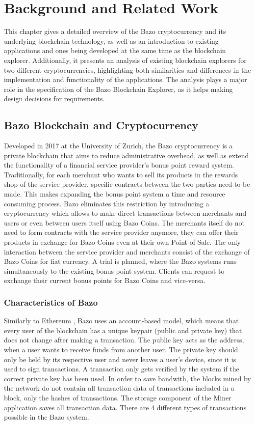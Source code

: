 \chapter{Background and Related Work}
This chapter gives a detailed overview of the Bazo cryptocurrency and its underlying blockchain technology, as well as an introduction to existing applications and ones being developed at the same time as the blockchain explorer. Additionally, it presents an analysis of existing blockchain explorers for two different cryptocurrencies, highlighting both similarities and differences in the implementation and functionality of the applications. The analysis plays a major role in the specification of the Bazo Blockchain Explorer, as it helps making design decisions for requirements.

\section{Bazo Blockchain and Cryptocurrency}
Developed in 2017 at the University of Zurich, the Bazo cryptocurrency is a private blockchain that aims to reduce administrative overhead, as well as extend the functionality of a financial service provider's bonus point reward system. Traditionally, for each merchant who wants to sell its products in the rewards shop of the service provider, specific contracts between the two parties need to be made. This makes expanding the bonus point system a time and resource consuming process. Bazo eliminates this restriction by introducing a cryptocurrency which allows to make direct transactions between merchants and users or even between users itself using Bazo Coins. The merchants itself do not need to form contracts with the service provider anymore, they can offer their products in exchange for Bazo Coins even at their own Point-of-Sale. The only interaction between the service provider and merchants consist of the exchange of Bazo Coins for fiat currency. A trial is planned, where the Bazo systems runs simultaneously to the existing bonus point system. Clients can request to exchange their current bonus points for Bazo Coins and vice-versa.

\subsection{Characteristics of Bazo}
Similarly to Ethereum \cite{ethereum}, Bazo uses an account-based model, which means that every user of the blockchain has a unique keypair (public and private key) that does not change after making a transaction. The public key acts as the address, when a user wants to receive funds from another user. The private key should only be held by its respective user and never leaves a user's device, since it is used to sign transactions. A transaction only gets verified by the system if the correct private key has been used. In order to save bandwith, the blocks mined by the network do not contain all transaction data of transactions included in a block, only the hashes of transactions. The storage component of the Miner application saves all transaction data. There are 4 different types of transactions possible in the Bazo system.

